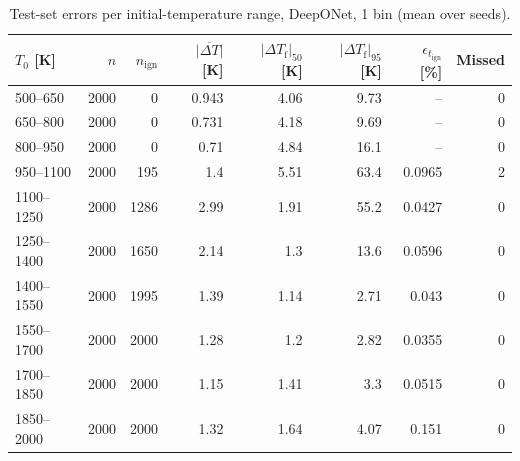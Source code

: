 \begin{table}[htbp]
    \centering
    \small
    \begin{tabular}{lrrrrrrr}
        \hline
        $T_0$ [K] & $n$ & $n_\mathrm{ign}$ & $\overline{|\Delta T|}$ [K] & $|\Delta T_\mathrm{f}|_{50}$ [K] & $|\Delta T_\mathrm{f}|_{95}$ [K] & $\epsilon_{t_\mathrm{ign}}$ [\%] & Missed \\
        \hline
        500--650 & 2000 & 0 & 0.943 & 4.06 & 9.73 & -- & 0 \\
        650--800 & 2000 & 0 & 0.731 & 4.18 & 9.69 & -- & 0 \\
        800--950 & 2000 & 0 & 0.71 & 4.84 & 16.1 & -- & 0 \\
        950--1100 & 2000 & 195 & 1.4 & 5.51 & 63.4 & 0.0965 & 2 \\
        1100--1250 & 2000 & 1286 & 2.99 & 1.91 & 55.2 & 0.0427 & 0 \\
        1250--1400 & 2000 & 1650 & 2.14 & 1.3 & 13.6 & 0.0596 & 0 \\
        1400--1550 & 2000 & 1995 & 1.39 & 1.14 & 2.71 & 0.043 & 0 \\
        1550--1700 & 2000 & 2000 & 1.28 & 1.2 & 2.82 & 0.0355 & 0 \\
        1700--1850 & 2000 & 2000 & 1.15 & 1.41 & 3.3 & 0.0515 & 0 \\
        1850--2000 & 2000 & 2000 & 1.32 & 1.64 & 4.07 & 0.151 & 0 \\
        \hline
    \end{tabular}
    \caption{Test-set errors per initial-temperature range, DeepONet, 1 bin (mean over seeds).}
    \label{tab:T0_deeponet_predicted_b1_conv}
\end{table}
